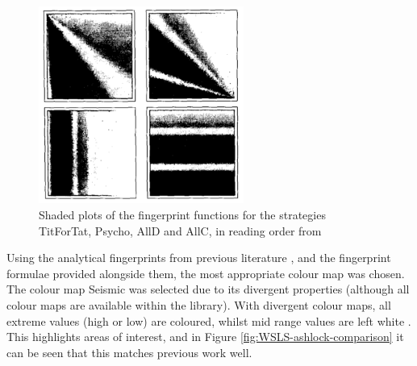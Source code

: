 \begin{figure}[hbtp!]
    \begin{center}
        \includegraphics[width = 0.6\textwidth]{../img/MultipleFingerprintsAshlock}
    \end{center}
    \caption{Shaded plots of the fingerprint functions for the strategies TitForTat, Psycho, AllD and AllC, in reading order from \cite{Ashlock2004}}
    \label{fig:ashlock-fingerprints}
\end{figure}

Using the analytical fingerprints from previous literature \cite{Ashlock2004, Ashlock2008}, and the fingerprint formulae provided alongside them, the most appropriate colour map was chosen.
The colour map Seismic \cite{matplotlib-colormap} was selected due to its divergent properties (although all colour maps are available within the library).
With divergent colour maps, all extreme values (high or low) are coloured, whilst mid range values are left white \cite{Moreland2009}.
This highlights areas of interest, and in Figure \ref{fig:WSLS-ashlock-comparison} it can be seen that this matches previous work well.

